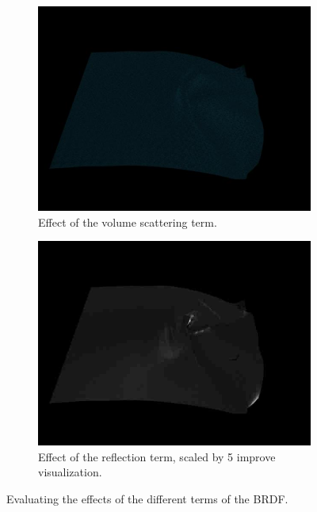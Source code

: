 \documentclass[12pt]{article}
\begin{document}
\begin{figure}[htbp!]
        \centering
        \begin{subfigure}[t]{0.48\textwidth}
                \includegraphics[width=\textwidth]{images/scatter_only}
                \caption{Effect of the volume scattering term.}
                \label{fig:scatter_only}
        \end{subfigure}
        \begin{subfigure}[t]{0.48\textwidth}
                \includegraphics[width=\textwidth]{images/reflect_only_x5}
                \caption{Effect of the reflection term, scaled by 5 improve visualization.}
                \label{fig:reflect_only_x5}
        \end{subfigure}
        \caption{Evaluating the effects of the different terms of the BRDF.}
\end{figure}
\end{document}
